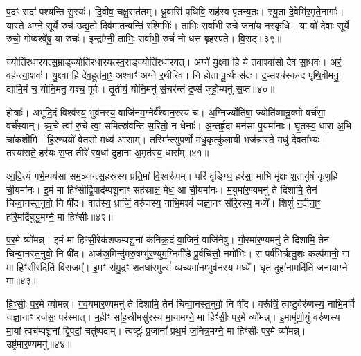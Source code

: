 प॒दꣳ सदा॑ पश्यन्ति सू॒रयः॑। दि॒वीव॒ चक्षु॒रात॑तम्। ध्रु॒वासि॑ पृथिवि॒ सह॑स्व पृतन्य॒तः। स्यू॒ता दे॒वेभि॑र॒मृते॒नागाः᳚। यास्ते॑ अग्ने॒ सूर्ये॒ रुच॑ उद्य॒तो दिव॑मात॒न्वन्ति॑ र॒श्मिभिः॑। ताभिः॒ सर्वा॑भी रु॒चे जना॑य नस्कृधि। या वो॑ देवाः॒ सूर्ये॒ रुचो॒ गोष्वश्वे॑षु॒ या रुचः॑। इन्द्रा᳚ग्नी॒ ताभिः॒ सर्वा॑भी॒ रुचं॑ नो धत्त बृहस्पते। वि॒राट्॥३९॥

ज्योति॑रधारयत्स॒म्राड्ज्योति॑रधारयत्स्व॒राड्ज्योति॑रधारयत्। अग्ने॑ यु॒क्ष्वा हि ये तवाश्वा॑सो देव सा॒धवः॑। अरं॒ वह॑न्त्या॒शवः॑। यु॒क्ष्वा हि दे॑व॒हूत॑मा॒ꣳ॒ अश्वाꣳ॑ अग्ने र॒थीरि॑व। नि होता॑ पू॒र्व्यः स॑दः। द्र॒प्सश्च॑स्कन्द पृथि॒वीमनु॒ द्यामि॒मं च॒ योनि॒मनु॒ यश्च॒ पूर्वः॑। तृ॒तीयं॒ योनि॒मनु॑ सं॒चर॑न्तं द्र॒प्सं जु॑हो॒म्यनु॑ स॒प्त॥४०॥

होत्राः᳚। अभू॑दि॒दं विश्व॑स्य॒ भुव॑नस्य॒ वाजि॑नम॒ग्नेर्वै᳚श्वान॒रस्य॑ च। अ॒ग्निर्ज्योति॑षा॒ ज्योति॑ष्मान्रु॒क्मो वर्च॑सा॒ वर्च॑स्वान्। ऋ॒चे त्वा॑ रु॒चे त्वा॒ समित्स्र॑वन्ति स॒रितो॒ न धेनाः᳚। अ॒न्तर्\mbox{}हृ॒दा मन॑सा पू॒यमा॑नाः। घृ॒तस्य॒ धारा॑ अ॒भि चा॑कशीमि। हि॒र॒ण्ययो॑ वेत॒सो मध्य॑ आसाम्। तस्मि᳚न्त्सुप॒र्णो म॑धु॒कृत्कु॑ला॒यी भज॑न्नास्ते॒ मधु॑ दे॒वता᳚भ्यः। तस्या॑सते॒ हर॑यः स॒प्त तीरे᳚ स्व॒धां दुहा॑ना अ॒मृत॑स्य॒ धारा᳚म्॥४१॥

{\anuvakamend[{प्र॒ति॒ष्ठायै॑ स॒हस्र॑वीर्या पर॒मं वि॒राट्थ्स॒प्त तीरे॑ च॒त्वारि॑ च॥९॥}]}

आ॒दि॒त्यं गर्भ॒म्पय॑सा सम॒ञ्जन्त्स॒हस्र॑स्य प्रति॒मां वि॒श्वरू॑पम्। परि॑ वृङ्ग्धि॒ हर॑सा॒ माभि मृ॑क्षः श॒तायु॑षं कृणुहि ची॒यमा॑नः। इ॒मं मा हिꣳ॑सीर्द्वि॒पाद॑म्पशू॒नाꣳ सह॑स्राक्ष॒ मेध॒ आ ची॒यमा॑नः। म॒युमा॑र॒ण्यमनु॑ ते दिशामि॒ तेन॑ चिन्वा॒नस्त॒नुवो॒ नि षी॑द। वात॑स्य॒ ध्राजिं॒ वरु॑णस्य॒ नाभि॒मश्वं॑ जज्ञा॒नꣳ स॑रि॒रस्य॒ मध्ये᳚। शिशुं॑ न॒दीना॒ꣳ॒ हरि॒मद्रि॑बुद्ध॒मग्ने॒ मा हिꣳ॑सीः॥४२॥

प॒र॒मे व्यो॑मन्न्। इ॒मं मा हिꣳ॑सी॒रेक॑शफम्पशू॒नां क॑निक्र॒दं वा॒जिनं॒ वाजि॑नेषु। गौ॒रमा॑र॒ण्यमनु॑ ते दिशामि॒ तेन॑ चिन्वा॒नस्त॒नुवो॒ नि षी॑द। अज॑स्र॒मिन्दु॑मरु॒षम्भु॑र॒ण्युम॒ग्निमी॑डे पू॒र्वचि॑त्तौ॒ नमो॑भिः। स पर्व॑भिर्\mbox{}ऋतु॒शः कल्प॑मानो॒ गां मा हिꣳ॑सी॒रदि॑तिं वि॒राजम्᳚। इ॒मꣳ स॑मु॒द्रꣳ श॒तधा॑र॒मुत्सं॑ व्य॒च्यमा॑न॒म्भुव॑नस्य॒ मध्ये᳚। घृ॒तं दुहा॑ना॒मदि॑तिं॒ जना॒याग्ने॒ मा॥४३॥

हि॒ꣳ॒सीः॒ प॒र॒मे व्यो॑मन्न्। ग॒व॒यमा॑र॒ण्यमनु॑ ते दिशामि॒ तेन॑ चिन्वा॒नस्त॒नुवो॒ नि षी॑द। वरू᳚त्रिं॒ त्वष्टु॒र्वरु॑णस्य॒ नाभि॒मविं॑ जज्ञा॒नाꣳ रज॑सः॒ पर॑स्मात्। म॒हीꣳ सा॑ह॒स्रीमसु॑रस्य मा॒यामग्ने॒ मा हिꣳ॑सीः॒ पर॒मे व्यो॑मन्न्। इ॒मामू᳚र्णा॒युं वरु॑णस्य मा॒यां त्वच॑म्पशू॒नां द्वि॒पदां॒ चतु॑ष्पदाम्। त्वष्टुः॑ प्र॒जानां᳚ प्रथ॒मं ज॒नित्र॒मग्ने॒ मा हिꣳ॑सीः पर॒मे व्यो॑मन्न्। उष्ट्र॑मार॒ण्यमनु॑॥४४॥


